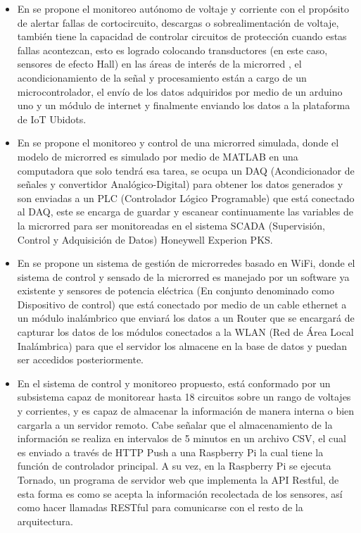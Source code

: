 \begin{itemize}
	\item En \citep{EstadoDelArte1} se propone el monitoreo autónomo de voltaje y corriente con el propósito de alertar fallas de cortocircuito, descargas o sobrealimentación de voltaje, también tiene la capacidad de controlar circuitos de protección cuando estas fallas acontezcan, esto es logrado colocando transductores (en este caso, sensores de efecto Hall) en las áreas de interés de la microrred , el acondicionamiento de la señal y procesamiento están a cargo de un microcontrolador, el envío de los datos adquiridos por medio de un arduino uno y un módulo de internet y finalmente enviando los datos a la plataforma de IoT Ubidots. 

    \item En \citep{EstadoDelArte2} se propone el monitoreo y control de una microrred simulada, donde el modelo de microrred es simulado por medio de MATLAB en una computadora que solo tendrá esa tarea, se ocupa un DAQ (Acondicionador de señales  y convertidor Analógico-Digital) para obtener los datos generados y son enviadas a un PLC (Controlador Lógico Programable) que está conectado al DAQ, este se encarga de guardar y escanear continuamente las variables de la microrred para ser monitoreadas en el sistema SCADA (Supervisión, Control y Adquisición de Datos) Honeywell Experion PKS.

    \item En \citep{EstadoDelArte3} se propone un sistema de gestión de microrredes basado en WiFi, donde el sistema de control y sensado de la microrred es manejado por un software ya existente y sensores de potencia eléctrica (En conjunto denominado como Dispositivo de control) que está conectado por medio de un cable ethernet a un módulo inalámbrico que enviará los datos a un Router que se encargará de capturar los datos de los módulos conectados a la WLAN (Red de Área Local Inalámbrica) para que el servidor los almacene en la base de datos y puedan ser accedidos posteriormente. 

    \item En \citep{EstadoDelArte4} el sistema de control y monitoreo propuesto, está conformado por un subsistema capaz de monitorear hasta 18 circuitos sobre un rango de voltajes y corrientes, y es capaz de almacenar la información de manera interna o bien cargarla a un servidor remoto. Cabe señalar que el almacenamiento de la información se realiza en intervalos de 5 minutos en un archivo CSV, el cual es enviado a través de HTTP Push a una Raspberry Pi la cual tiene la función de controlador principal. A su vez, en la Raspberry Pi se ejecuta Tornado, un programa de servidor web que implementa la API Restful, de esta forma es como se acepta la información recolectada de los sensores, así como hacer llamadas RESTful para comunicarse con el resto de la arquitectura.
\end{itemize}